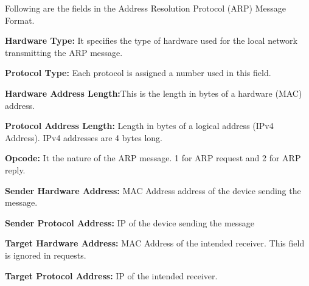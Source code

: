 \documentclass{article}
\begin{document}
Following are the fields in the Address Resolution Protocol (ARP) Message Format.
\par\newline
\textbf{Hardware Type: } It specifies the type of hardware used for the local network transmitting the ARP message. 
\par\newline
\textbf{Protocol Type:} Each protocol is assigned a number used in this field. 
\par\newline
\textbf{Hardware Address Length:}This is the length in bytes of a hardware (MAC) address.
\par\newline
\textbf{Protocol Address Length:} Length in bytes of a logical address (IPv4 Address). IPv4 addresses are 4 bytes long.
\par\newline
\textbf{Opcode:} It the nature of the ARP message. 1 for ARP request and 2 for ARP reply.
\par\newline
\textbf{Sender Hardware Address:} MAC Address  address of the device sending the message.
\par\newline
\textbf{Sender Protocol Address:} IP  of the device sending the message
\par\newline
\textbf{Target Hardware Address:} MAC Address of the intended receiver. This field is ignored in requests.
\par\newline
\textbf{Target Protocol Address:} IP of the intended receiver.
\end{document}
